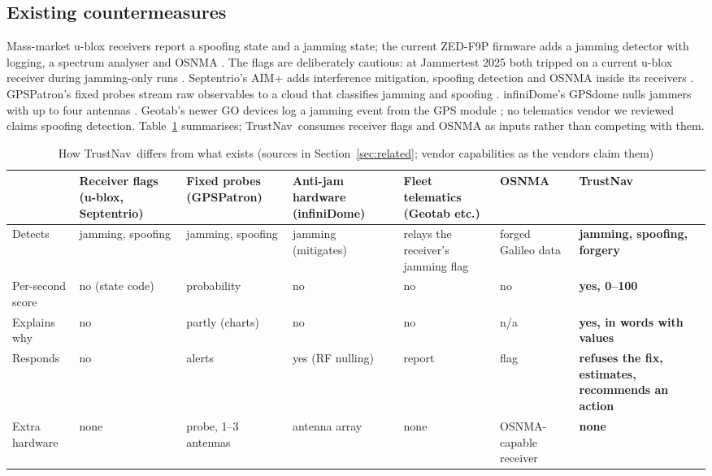 \documentclass[conference]{IEEEtran}
\newcommand{\sys}{TrustNav}
\begin{document}
\subsection{Existing countermeasures}
Mass-market u-blox receivers report a spoofing state and a jamming state; the current ZED-F9P firmware adds a jamming detector with logging, a spectrum analyser and OSNMA \cite{ublox2024}. The flags are deliberately cautious: at Jammertest 2025 both tripped on a current u-blox receiver during jamming-only runs \cite{ublox_jammertest}. Septentrio's AIM+ adds interference mitigation, spoofing detection and OSNMA inside its receivers \cite{septentrio2025}. GPSPatron's fixed probes stream raw observables to a cloud that classifies jamming and spoofing \cite{gpspatron}. infiniDome's GPSdome nulls jammers with up to four antennas \cite{gpsdome2}. Geotab's newer GO devices log a jamming event from the GPS module \cite{geotab2025}; no telematics vendor we reviewed claims spoofing detection. Table~\ref{tab:compare} summarises; \sys\ consumes receiver flags and OSNMA as inputs rather than competing with them.

\begin{table}[t]
\caption{How \sys\ differs from what exists (sources in Section~\ref{sec:related}; vendor capabilities as the vendors claim them)}
\label{tab:compare}
\centering
\scriptsize
\setlength{\tabcolsep}{4pt}
\begin{tabular}{@{}>{\raggedright}p{2.2cm}>{\raggedright}p{2.15cm}>{\raggedright}p{2.15cm}>{\raggedright}p{2.15cm}>{\raggedright}p{2.15cm}>{\raggedright}p{2.15cm}>{\raggedright\arraybackslash}p{2.9cm}@{}}
\toprule
 & Receiver flags (u-blox, Septentrio) & Fixed probes (GPSPatron) & Anti-jam hardware (infiniDome) & Fleet telematics (Geotab etc.) & OSNMA & \textbf{\sys} \\
\midrule
Detects & jamming, spoofing & jamming, spoofing & jamming (mitigates) & relays the receiver's jamming flag & forged Galileo data & \textbf{jamming, spoofing, forgery} \\
Per-second score & no (state code) & probability & no & no & no & \textbf{yes, 0--100} \\
Explains why & no & partly (charts) & no & no & n/a & \textbf{yes, in words with values} \\
Responds & no & alerts & yes (RF nulling) & report & flag & \textbf{refuses the fix, estimates, recommends an action} \\
Extra hardware & none & probe, 1--3 antennas & antenna array & none & OSNMA-capable receiver & \textbf{none} \\
\bottomrule
\end{tabular}
\end{table}
\end{document}
